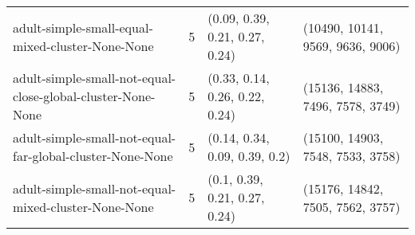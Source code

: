 \begin{longtable}{llll}
                                                             adult-simple-small-equal-mixed-cluster-None-None &              5 &                                                                                                                                                                                                                                                                            (0.09, 0.39, 0.21, 0.27, 0.24) &                                                                                                                                                                                                                                                                          (10490, 10141, 9569, 9636, 9006) \\
                                                  adult-simple-small-not-equal-close-global-cluster-None-None &              5 &                                                                                                                                                                                                                                                                            (0.33, 0.14, 0.26, 0.22, 0.24) &                                                                                                                                                                                                                                                                          (15136, 14883, 7496, 7578, 3749) \\
                                                    adult-simple-small-not-equal-far-global-cluster-None-None &              5 &                                                                                                                                                                                                                                                                             (0.14, 0.34, 0.09, 0.39, 0.2) &                                                                                                                                                                                                                                                                          (15100, 14903, 7548, 7533, 3758) \\
                                                         adult-simple-small-not-equal-mixed-cluster-None-None &              5 &                                                                                                                                                                                                                                                                             (0.1, 0.39, 0.21, 0.27, 0.24) &                                                                                                                                                                                                                                                                          (15176, 14842, 7505, 7562, 3757) \\

\end{longtable}

